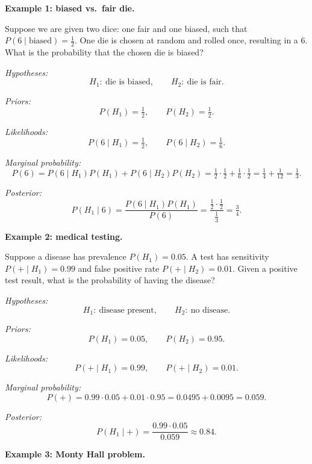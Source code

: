 \medskip

\textbf{Example 1: biased vs.\ fair die.}

\medskip

Suppose we are given two dice: one fair and one biased, such that $P(6 \mid \text{biased})=\tfrac{1}{2}.$
One die is chosen at random and rolled once, resulting in a $6$. What is the probability that the chosen die is biased?

\medskip

\textit{Hypotheses:}
\[
    H_1:\ \text{die is biased}, \qquad H_2:\ \text{die is fair}.
\]

\textit{Priors:}
\[
    P(H_1)=\tfrac{1}{2}, \qquad P(H_2)=\tfrac{1}{2}.
\]

\textit{Likelihoods:}
\[
    P(6 \mid H_1)=\tfrac{1}{2}, \qquad P(6 \mid H_2)=\tfrac{1}{6}.
\]

\textit{Marginal probability:}
\[
    P(6)=P(6 \mid H_1)P(H_1)+P(6 \mid H_2)P(H_2)
    = \tfrac{1}{2}\cdot\tfrac{1}{2}+\tfrac{1}{6}\cdot\tfrac{1}{2}
    = \tfrac{1}{4}+\tfrac{1}{12}
    = \tfrac{1}{3}.
\]

\textit{Posterior:}
\[
    P(H_1 \mid 6)=\frac{P(6 \mid H_1)P(H_1)}{P(6)}
    =\frac{\tfrac{1}{2}\cdot\tfrac{1}{2}}{\tfrac{1}{3}}
    =\tfrac{3}{4}.
\]

\medskip

\textbf{Example 2: medical testing.}

\medskip

Suppose a disease has prevalence $P(H_1)=0.05$. A test has sensitivity $P(+ \mid H_1)=0.99$ and false positive rate $P(+ \mid H_2)=0.01$. Given a positive test result, what is the probability of having the disease?

\medskip

\textit{Hypotheses:}
\[
    H_1:\ \text{disease present}, \qquad H_2:\ \text{no disease}.
\]

\textit{Priors:}
\[
    P(H_1)=0.05, \qquad P(H_2)=0.95.
\]

\textit{Likelihoods:}
\[
    P(+ \mid H_1)=0.99, \qquad P(+ \mid H_2)=0.01.
\]

\textit{Marginal probability:}
\[
    P(+)=0.99\cdot 0.05 + 0.01\cdot 0.95
    =0.0495+0.0095
    =0.059.
\]

\textit{Posterior:}
\[
    P(H_1 \mid +)=\frac{0.99\cdot 0.05}{0.059}
    \approx 0.84.
\]

\medskip

\textbf{Example 3: Monty Hall problem.}

\medskip

